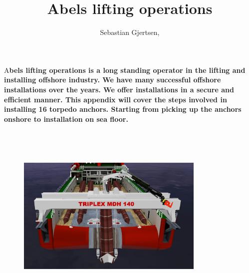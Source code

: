 \documentclass[DIV=calc, paper=a4, fontsize=13pt, twocolumn]{scrartcl}	 %
\title{Abels lifting operations} %
\author{Sebastian Gjertsen, } %
\date{} %
\newcommand{\initial}[1]{ %
\lettrine[lines=3,lhang=0.3,nindent=0em]{
\color{DarkGoldenrod}
{\textsf{#1}}}{}}
\begin{document}
\maketitle %

\thispagestyle{fancy} %


\initial{A}\textbf{bels lifting operations is a long standing operator in the lifting and installing offshore industry. We have many successful offshore installations over the years. We offer installations in a secure and efficient manner. This appendix will cover the steps involved in installing 16 torpedo anchors. Starting from picking up the anchors onshore to installation on sea floor.}



\begin{figure}[h]
\includegraphics[width=9cm,height=9cm]{Triplex_MDH_140_C.jpg}
\end{figure}
\end{document}
